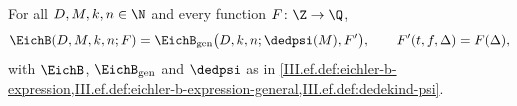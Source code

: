 For all $D,M,k,n\in\N$ and every function $F\colon\Z\to\Q$,
\[
  \EichB(D,M,k,n;F)=\EichB_{\mathrm{gen}}\bigl(D,k,n;\dedpsi(M),F'\bigr),\qquad F'(t,f,\Delta)=F(\Delta),
\]
with $\EichB$, $\EichB_{\mathrm{gen}}$ and $\dedpsi$ as in
\cref{III.ef.def:eichler-b-expression,III.ef.def:eichler-b-expression-general,III.ef.def:dedekind-psi}.
